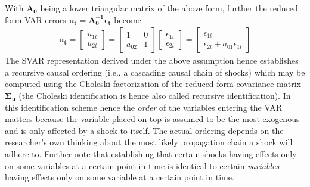 \documentclass[a4paper,11pt,listof=nochaptergap,oneside,pointednumbers,bibtotoc,bigheadings,liststotoc]{scrbook}
\theoremstyle{mysatz}
\theoremstyle{mydefinition}
\theoremstyle{mytheorem}
\theoremstyle{mybemerkung}
\newcommand{\vect}[1]{\boldsymbol{\mathbf{#1}}}
\begin{document}
With $\vect{A_0}$ being a lower triangular matrix of the above form, further the reduced form VAR errors $\vect{u_t} = \vect{A_0^{-1}}\vect{\epsilon_t}$ become
\begin{equation} \label{eq:svar13}
\begin{split}
 		\vect{u_t} = \begin{bmatrix}
    					u_{1t} \\
					u_{2t} 
 					\end{bmatrix} = 
						\begin{bmatrix}
    						1 & 0 \\
						a_{02} & 1  
 						\end{bmatrix} 
							\begin{bmatrix}
    							\epsilon_{1t} \\
							\epsilon_{2t} 
 							\end{bmatrix} = 
								\begin{bmatrix}
    								\epsilon_{1t} \\
								\epsilon_{2t}+a_{01}\epsilon_{1t} 
 								\end{bmatrix} 			
\end{split}								
\end{equation}
The SVAR representation derived under the above assumption hence establishes a recursive causal ordering (i.e., a cascading causal chain of shocks) which may be computed using the Choleski factorization of the reduced form covariance matrix $\vect{\Sigma_u}$ (the Choleski identification is hence also called recursive identification). In this identification scheme hence the \textit{order} of the variables entering the VAR matters because the variable placed on top is assumed to be the most exogenous and is only affected by a shock to itself. The actual ordering depends on the researcher's own thinking about the most likely propagation chain a shock will adhere to. Further note that establishing that certain shocks having effects only on some variables at a certain point in time is identical to certain \textit{variables} having effects only on some variable at a certain point in time.
\end{document}
